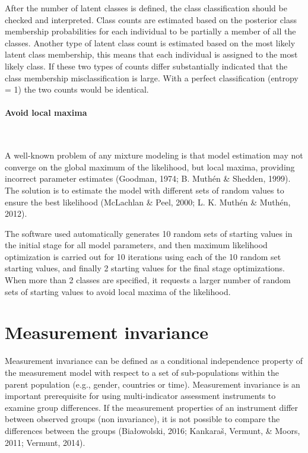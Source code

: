 \documentclass[12pt,a4paper,oneside]{reedthesis}
\begin{document}
After the number of latent classes is defined, the class classification should be checked and interpreted. Class counts are estimated based on the posterior class membership probabilities for each individual to be partially a member of all the classes. Another type of latent class count is estimated based on the most likely latent class membership, this means that each individual is assigned to the most likely class. If these two types of counts differ substantially indicated that the class membership misclassification is large. With a perfect classification (entropy = 1) the two counts would be identical.

\hypertarget{avoid-local-maxima}{%
\paragraph{Avoid local maxima}\label{avoid-local-maxima}}

~

A well-known problem of any mixture modeling is that model estimation may not converge on the global maximum of the likelihood, but local maxima, providing incorrect parameter estimates (Goodman, 1974; B. Muthén \& Shedden, 1999). The solution is to estimate the model with different sets of random values to ensure the best likelihood (McLachlan \& Peel, 2000; L. K. Muthén \& Muthén, 2012).

The software used automatically generates 10 random sets of starting values in the initial stage for all model parameters, and then maximum likelihood optimization is carried out for 10 iterations using each of the 10 random set starting values, and finally 2 starting values for the final stage optimizations. When more than 2 classes are specified, it requests a larger number of random sets of starting values to avoid local maxima of the likelihood.

\hypertarget{measurement-invariance}{%
\section{Measurement invariance}\label{measurement-invariance}}

Measurement invariance can be defined as a conditional independence property of the measurement model with respect to a set of sub-populations within the parent population (e.g., gender, countries or time). Measurement invariance is an important prerequisite for using multi-indicator assessment instruments to examine group differences. If the measurement properties of an instrument differ between observed groups (non invariance), it is not possible to compare the differences between the groups (Białowolski, 2016; Kankaraš, Vermunt, \& Moors, 2011; Vermunt, 2014).
\end{document}
